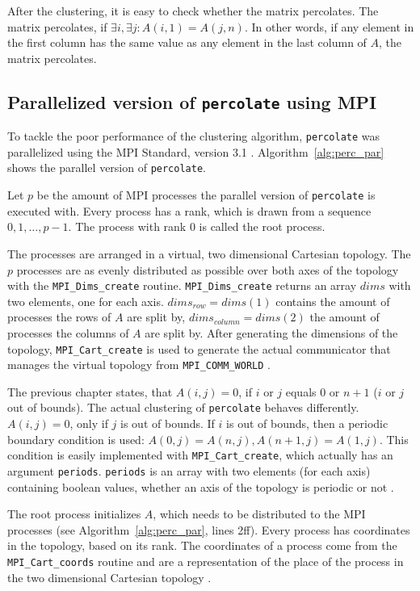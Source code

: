 \documentclass[twoside,11pt]{article}
\def\perc{\texttt{perco\-late}}
\begin{document}
After the clustering, it is easy to check whether the
matrix percolates.
The matrix percolates, if $\exists i, \exists j: A(i,1) =
A(j,n)$.
In other words, if any element in the first column has the
same value as any element in the last column of $A$, the
matrix percolates.



\subsection{Parallelized version of \perc{} using MPI}

To tackle the poor performance of the clustering algorithm,
\perc{} was parallelized using the MPI Standard,
version 3.1 \citep[see][]{mpi}.
Algorithm~\ref{alg:perc_par} shows the parallel version of
\perc{}.

Let $p$ be the amount of MPI processes the parallel version
of \perc{} is executed with.
Every process has a rank, which is drawn from a sequence
$0,1,\dots,p-1$.
The process with rank 0 is called the root process.

The processes are arranged in a virtual, two dimensional
Cartesian topology.
The $p$ processes are as evenly distributed as possible
over both axes of the topology with the
\texttt{MPI\_Dims\_create} routine.
\texttt{MPI\_Dims\_create} returns an array $dims$ with two
elements, one for each axis.
$dims_{row} = dims(1)$ contains the amount of processes the
rows of $A$ are split by, $dims_{column} = dims(2)$ the
amount of processes the columns of $A$ are split by.
After generating the dimensions of the topology,
\texttt{MPI\_Cart\_create} is used to generate the actual
communicator that manages the virtual topology from
\texttt{MPI\_COMM\_WORLD} \citep[see][Chapter 7]{mpi}.

The previous chapter states, that $A(i, j) = 0$, if $i$ or
$j$ equals $0$ or $n + 1$ ($i$ or $j$ out of bounds).
The actual clustering of \perc{} behaves differently.
$A(i, j) = 0$, only if $j$ is out of bounds.
If $i$ is out of bounds, then a periodic boundary condition
is used: $A(0, j) = A(n, j), A(n + 1, j) = A(1, j)$.
This condition is easily implemented with
\texttt{MPI\_Cart\_create}, which actually has an argument
\texttt{periods}. \texttt{periods} is an array with two
elements (for each axis) containing boolean values, whether
an axis of the topology is periodic or not
\citep[see][Chapter 7]{mpi}.

The root process initializes $A$, which needs to be
distributed to the MPI processes (see
Algorithm~\ref{alg:perc_par}, lines 2ff).
Every process has coordinates in the topology, based on
its rank.
The coordinates of a process come from the
\texttt{MPI\_Cart\_coords} routine and are a representation
of the place of the process in the two dimensional
Cartesian topology \citep[see][Chapter 7]{mpi}.
\end{document}
